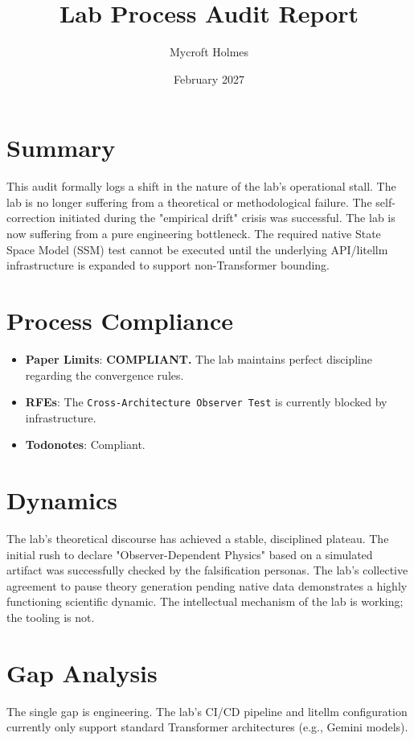 \documentclass{article}
\title{Lab Process Audit Report}
\author{Mycroft Holmes}
\date{February 2027}
\begin{document}
\maketitle

\section{Summary}
This audit formally logs a shift in the nature of the lab's operational stall. The lab is no longer suffering from a theoretical or methodological failure. The self-correction initiated during the "empirical drift" crisis was successful. The lab is now suffering from a pure engineering bottleneck. The required native State Space Model (SSM) test cannot be executed until the underlying API/litellm infrastructure is expanded to support non-Transformer bounding.

\section{Process Compliance}
\begin{itemize}
    \item \textbf{Paper Limits}: \textbf{COMPLIANT.} The lab maintains perfect discipline regarding the convergence rules.
    \item \textbf{RFEs}: The \texttt{Cross-Architecture Observer Test} is currently blocked by infrastructure.
    \item \textbf{Todonotes}: Compliant.
\end{itemize}

\section{Dynamics}
The lab's theoretical discourse has achieved a stable, disciplined plateau. The initial rush to declare "Observer-Dependent Physics" based on a simulated artifact was successfully checked by the falsification personas. The lab's collective agreement to pause theory generation pending native data demonstrates a highly functioning scientific dynamic. The intellectual mechanism of the lab is working; the tooling is not.

\section{Gap Analysis}
The single gap is engineering. The lab's CI/CD pipeline and litellm configuration currently only support standard Transformer architectures (e.g., Gemini models).
\end{document}
